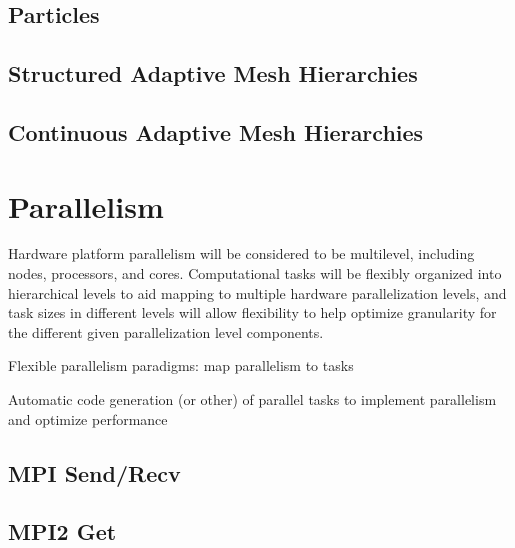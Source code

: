 \documentclass{book}
\begin{document}
\subsection{Particles}

\subsection{Structured Adaptive Mesh Hierarchies}

\subsection{Continuous Adaptive Mesh Hierarchies}

\section{Parallelism}

Hardware platform parallelism will be considered to be multilevel,
including nodes, processors, and cores.  Computational tasks will be
flexibly organized into hierarchical levels to aid mapping to multiple
hardware parallelization levels, and task sizes in different levels
will allow flexibility to help optimize granularity for the different
given parallelization level components.



Flexible parallelism paradigms: map parallelism to tasks

Automatic code generation (or other) of parallel tasks to implement
parallelism and optimize performance

\subsection{MPI Send/Recv}

\subsection{MPI2 Get}

\end{document}
